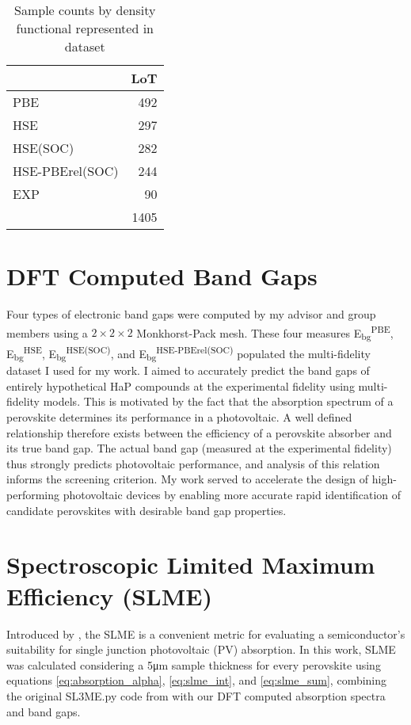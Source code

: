  
\begin{table}[htbp]
\caption{\label{tbl:LoTs} Sample counts by density functional represented in dataset}
\centering
\begin{tabular}{lr}
 & LoT\\[0pt]
\hline
PBE & 492\\[0pt]
HSE & 297\\[0pt]
HSE(SOC) & 282\\[0pt]
HSE-PBErel(SOC) & 244\\[0pt]
EXP & 90\\[0pt]
\hline
 & 1405\\[0pt]
\end{tabular}
\end{table}

\section{DFT Computed Band Gaps}
\label{sec:org7daa035}
Four types of electronic band gaps were computed by my advisor and group members using a \(2\times{}2\times{}2\) Monkhorst-Pack mesh.
These four measures E\textsubscript{bg}\textsuperscript{PBE}, E\textsubscript{bg}\textsuperscript{HSE}, E\textsubscript{bg}\textsuperscript{HSE(SOC)}, and E\textsubscript{bg}\textsuperscript{HSE-PBErel(SOC)} populated the multi-fidelity dataset I used for my work.
I aimed to accurately predict the band gaps of entirely hypothetical HaP compounds at the experimental fidelity using multi-fidelity models. 
This is motivated by the fact that the absorption spectrum of a perovskite determines its performance in a photovoltaic.
\autocite{mannodi-kanakkithodi-2019-compr-comput}
A well defined relationship therefore exists between the efficiency of a perovskite absorber and its true band gap.
\autocite{yu-2012-ident-poten}
The actual band gap (measured at the experimental fidelity) thus strongly predicts photovoltaic performance, and analysis of this relation informs the screening criterion.
My work served to accelerate the design of high-performing photovoltaic devices by enabling more accurate rapid identification of candidate perovskites with desirable band gap properties.

\section{Spectroscopic Limited Maximum Efficiency (SLME)}
\label{sec:org67dad11}
Introduced by \textcite{yu-2012-ident-poten}, the SLME is a convenient metric for evaluating a semiconductor's suitability for single junction photovoltaic (PV) absorption.
In this work, SLME was calculated considering a 5\unit{\micro\meter} sample thickness for every perovskite using equations \ref{eq:absorption_alpha}, \ref{eq:slme_int}, and \ref{eq:slme_sum}, combining the original SL3ME.py code from \textcite{yu-2012-ident-poten} with our DFT computed absorption spectra and band gaps.

